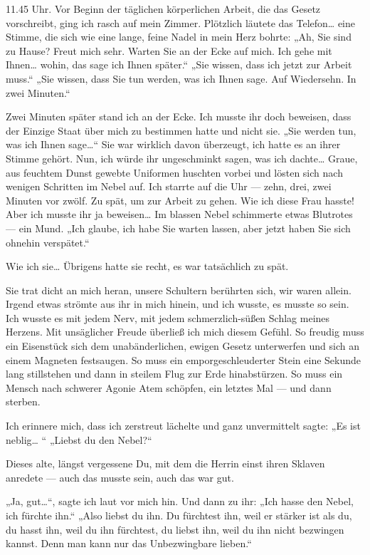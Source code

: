 11.45 Uhr. Vor Beginn der täglichen körperlichen Arbeit, die das
Gesetz vorschreibt, ging ich rasch auf mein Zimmer. Plötzlich
läutete das Telefon\ldots{} eine Stimme, die sich wie eine lange, feine
Nadel in mein Herz bohrte: „Ah, Sie sind zu Hause? Freut mich sehr.
Warten Sie an der Ecke auf mich. Ich gehe mit Ihnen\ldots{} wohin, das
sage ich Ihnen später.“ „Sie wissen, dass ich jetzt zur Arbeit
muss.“ „Sie wissen, dass Sie tun werden, was ich Ihnen sage. Auf
Wiedersehn. In zwei Minuten.“

Zwei Minuten später stand ich an der Ecke. Ich musste ihr doch
beweisen, dass der Einzige Staat über mich zu bestimmen hatte und
nicht sie. „Sie werden tun, was ich Ihnen sage\ldots{}“ Sie war wirklich
davon überzeugt, ich hatte es an ihrer Stimme gehört. Nun, ich
würde ihr ungeschminkt sagen, was ich dachte\ldots{} Graue, aus feuchtem
Dunst gewebte Uniformen huschten vorbei und lösten sich nach
wenigen Schritten im Nebel auf. Ich starrte auf die Uhr — zehn,
drei, zwei Minuten vor zwölf. Zu spät, um zur Arbeit zu gehen. Wie
ich diese Frau hasste! Aber ich musste ihr ja beweisen\ldots{} Im
blassen Nebel schimmerte etwas Blutrotes — ein Mund. „Ich glaube,
ich habe Sie warten lassen, aber jetzt haben Sie sich ohnehin
verspätet.“

Wie ich sie\ldots{} Übrigens hatte sie recht, es war tatsächlich zu
spät.

Sie trat dicht an mich heran, unsere Schultern berührten sich, wir
waren allein. Irgend etwas strömte aus ihr in mich hinein, und ich
wusste, es musste so sein. Ich wusste es mit jedem Nerv, mit jedem
schmerzlich-süßen Schlag meines Herzens. Mit unsäglicher Freude
überließ ich mich diesem Gefühl. So freudig muss ein Eisenstück
sich dem unabänderlichen, ewigen Gesetz unterwerfen und sich an
einem Magneten festsaugen. So muss ein emporgeschleuderter Stein
eine Sekunde lang stillstehen und dann in steilem Flug zur Erde
hinabstürzen. So muss ein Mensch nach schwerer Agonie Atem
schöpfen, ein letztes Mal — und dann sterben.

Ich erinnere mich, dass ich zerstreut lächelte und ganz
unvermittelt sagte: „Es ist neblig\ldots{} “ „Liebst du den Nebel?“

Dieses alte, längst vergessene Du, mit dem die Herrin einst ihren
Sklaven anredete — auch das musste sein, auch das war gut.

„Ja, gut\ldots{}“, sagte ich laut vor mich hin. Und dann zu ihr: „Ich
hasse den Nebel, ich fürchte ihn.“ „Also liebst du ihn. Du
fürchtest ihn, weil er stärker ist als du, du hasst ihn, weil du
ihn fürchtest, du liebst ihn, weil du ihn nicht bezwingen kannst.
Denn man kann nur das Unbezwingbare lieben.“

